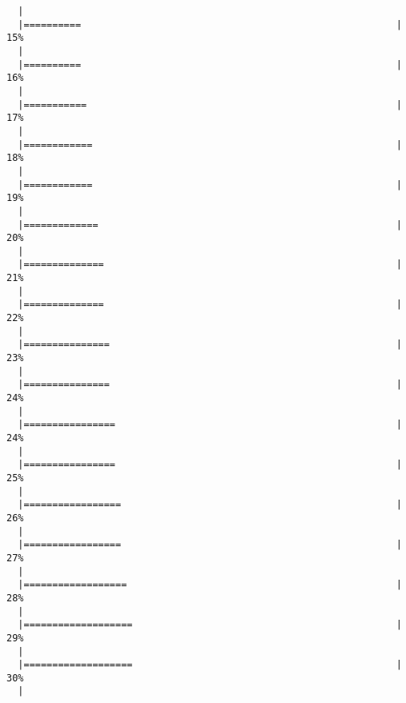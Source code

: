 \documentclass[]{article}
\begin{document}
\begin{verbatim}
  |                                                                       
  |==========                                                       |  15%
  |                                                                       
  |==========                                                       |  16%
  |                                                                       
  |===========                                                      |  17%
  |                                                                       
  |============                                                     |  18%
  |                                                                       
  |============                                                     |  19%
  |                                                                       
  |=============                                                    |  20%
  |                                                                       
  |==============                                                   |  21%
  |                                                                       
  |==============                                                   |  22%
  |                                                                       
  |===============                                                  |  23%
  |                                                                       
  |===============                                                  |  24%
  |                                                                       
  |================                                                 |  24%
  |                                                                       
  |================                                                 |  25%
  |                                                                       
  |=================                                                |  26%
  |                                                                       
  |=================                                                |  27%
  |                                                                       
  |==================                                               |  28%
  |                                                                       
  |===================                                              |  29%
  |                                                                       
  |===================                                              |  30%
  |                                                                       

\end{verbatim}
\end{document}
